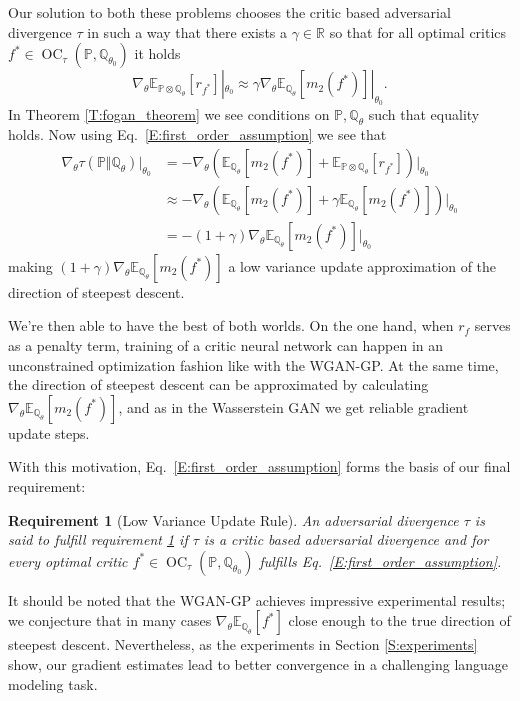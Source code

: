 \documentclass{article}
\DeclareMathOperator{\oc}{OC}
\newtheorem{requirement}{Requirement}
\begin{document}
Our solution to both these problems chooses the critic based adversarial divergence $\tau$
in such a way that there exists a $\gamma\in\mathbb R$
so that for all optimal critics $f^*\in\oc_{\tau}(\mathbb P,\mathbb Q_{\theta_0})$ it holds
\begin{equation}\label{E:first_order_assumption}
 \nabla_\theta\mathbb E_{\mathbb P\otimes\mathbb Q_\theta}[r_{f^*}]|_{\theta_0}\approx \gamma\nabla_\theta\mathbb E_{\mathbb Q_\theta}[m_2(f^*)]|_{\theta_0}.
\end{equation}
In Theorem \ref{T:fogan_theorem} we see conditions on $\mathbb P, \mathbb Q_\theta$ such that equality holds. Now using Eq.\ \ref{E:first_order_assumption} we see that
\begin{align*}
\nabla_\theta\tau(\mathbb P\Vert\mathbb Q_\theta)|_{\theta_0}&=-\nabla_\theta(\mathbb E_{\mathbb Q_\theta}[m_2(f^*)]+\mathbb E_{\mathbb P\otimes\mathbb Q_\theta}[r_{f^*}])|_{\theta_0}\\
&\approx-\nabla_\theta(\mathbb E_{\mathbb Q_\theta}[m_2(f^*)]+\gamma\mathbb E_{\mathbb Q_\theta}[m_2(f^*)])|_{\theta_0}\\
&=-(1+\gamma)\nabla_\theta\mathbb E_{\mathbb Q_\theta}[m_2(f^*)]|_{\theta_0}
\end{align*}
making $(1+\gamma)\nabla_\theta\mathbb E_{\mathbb Q_\theta}[m_2(f^*)]$ a low variance update approximation of the direction of steepest descent.

We're then able to have the best of both worlds.
On the one hand, when $r_f$ serves as a penalty term, training of a critic neural network can happen in
an unconstrained optimization fashion like with the WGAN-GP.
At the same time, the direction of steepest descent can be approximated by calculating $\nabla_\theta\mathbb E_{\mathbb Q_\theta}[m_2(f^*)]$,
and as in the Wasserstein GAN we get reliable gradient update steps.

With this motivation, Eq.\ \ref{E:first_order_assumption} forms the basis of our final requirement:
\begin{requirement}[Low Variance Update Rule]\label{R:fo_divergence}
 An adversarial divergence $\tau$ is said to fulfill requirement \ref{R:fo_divergence} if
 $\tau$ is a critic based adversarial divergence and
 for every optimal critic $f^*\in\oc_{\tau}(\mathbb P,\mathbb Q_{\theta_0})$ fulfills Eq.\ \ref{E:first_order_assumption}.
 \end{requirement}
 
It should be noted that the WGAN-GP achieves impressive experimental results; we conjecture that in
many cases $\nabla_\theta\mathbb E_{\mathbb Q_\theta}[f^*]$ close enough to the true direction of steepest descent.
Nevertheless, as the experiments in Section \ref{S:experiments} show, our gradient estimates lead to better convergence in
a challenging language modeling task.
\end{document}
